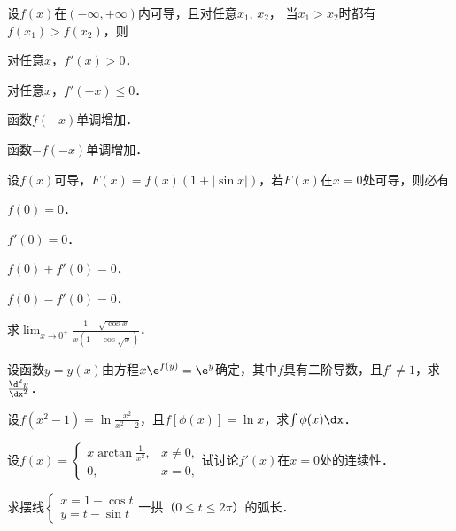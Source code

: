 \documentclass[plain,noanswer,medmath]{../../template/jnuexam}
\begin{document}
\begin{problem}
设$f(x)$在$(-\infty , +\infty)$内可导，且对任意$x_1$, $x_2$，
当$x_1 > x_2$时都有$f(x_1) > f(x_2)$，则\pickout{}
\begin{abcd}
\item 对任意$x$，$f'(x) > 0$．		
\item 对任意$x$，$f'(- x) \le 0$．
\item 函数$f(- x)$单调增加．
\item 函数$- f(- x)$单调增加．
\end{abcd}
\end{problem}




\begin{problem}
设$f(x)$可导，$F(x) = f(x)(1 + |\sin x|)$，若$F(x)$在$x = 0$处可导，则必有\pickout{}
\begin{abcd}
\item $f(0) = 0$．							
\item $f'(0) = 0$．
\item $f(0) + f'(0) = 0$．					
\item $f(0) - f'(0) = 0$．
\end{abcd}
\end{problem}




\begin{problem}
求$\lim_{x \to 0^+} \frac{1 - \sqrt{\cos x}}{x(1 - \cos \sqrt{x})}$．
\end{problem}


\begin{problem}
设函数$y = y(x)$由方程$x\e^{f(y)} = \e^y$确定，其中$f$具有二阶导数，且$f' \ne 1$，求$\frac{\d^2 y}{\dx^2}$．
\end{problem}


\begin{problem}
设$f(x^2 - 1) = \ln \frac{x^2}{x^2 - 2}$，且$f[\phi(x)] = \ln x$，求$\int \phi(x)\dx$．
\end{problem}


\begin{problem}
设$f(x) = \begin{cases}
  x\arctan\frac{1}{x^2}, & x \ne 0, \\
 0, & x = 0,
\end{cases}$试讨论$f'(x)$在$x = 0$处的连续性．
\end{problem}


\begin{problem}
求摆线$\begin{cases}
  x = 1 - \cos t \\
  y = t - \sin t
\end{cases}$一拱（$0 \le t \le 2\pi$）的弧长．
\end{problem}
\end{document}
